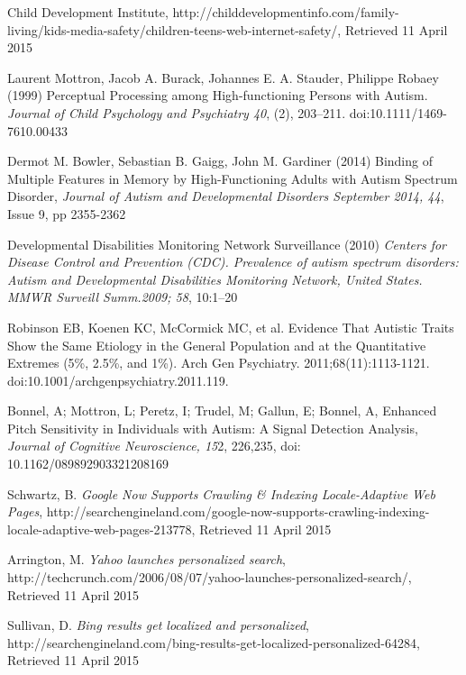 \documentclass[a4paper, 11pt]{article}
\begin{document}
\begin{justify}
\end{justify}


\begin{thebibliography}{100}
 Child Development Institute, http://childdevelopmentinfo.com/family-living/kids-media-safety/children-teens-web-internet-safety/, Retrieved 11 April 2015

 Laurent Mottron, Jacob A. Burack, Johannes E. A. Stauder, Philippe Robaey (1999) Perceptual Processing among High-functioning Persons with Autism. \textit{Journal of Child Psychology and Psychiatry 40}, (2), 203–211. doi:10.1111/1469-7610.00433

Dermot M. Bowler, Sebastian B. Gaigg, John M. Gardiner (2014) Binding of Multiple Features in Memory by High-Functioning Adults with Autism Spectrum Disorder, \textit{Journal of Autism and Developmental Disorders September 2014, 44}, Issue 9, pp 2355-2362

Developmental Disabilities Monitoring Network Surveillance (2010) \textit{Centers for Disease Control and Prevention (CDC). Prevalence of autism spectrum disorders: Autism and Developmental Disabilities Monitoring Network, United States. MMWR Surveill Summ.2009; 58}, 10:1–20

 Robinson EB, Koenen KC, McCormick MC, et al. Evidence That Autistic Traits Show the Same Etiology in the General Population and at the Quantitative Extremes (5\%, 2.5\%, and 1\%). Arch Gen Psychiatry. 2011;68(11):1113-1121. doi:10.1001/archgenpsychiatry.2011.119.

 Bonnel, A; Mottron, L; Peretz, I; Trudel, M; Gallun, E; Bonnel, A, Enhanced Pitch Sensitivity in Individuals with Autism: A Signal Detection Analysis, \textit{Journal of Cognitive Neuroscience, 15}2, 226,235, doi: 10.1162/089892903321208169

Schwartz, B. \textit{Google Now Supports Crawling \& Indexing Locale-Adaptive Web Pages}, http://searchengineland.com/google-now-supports-crawling-indexing-locale-adaptive-web-pages-213778, Retrieved 11 April 2015

Arrington, M. \textit{Yahoo launches personalized search}, http://techcrunch.com/2006/08/07/yahoo-launches-personalized-search/, Retrieved 11 April 2015

Sullivan, D. \textit{Bing results get localized and personalized}, http://searchengineland.com/bing-results-get-localized-personalized-64284, Retrieved 11 April 2015


\end{thebibliography}
\end{document}

